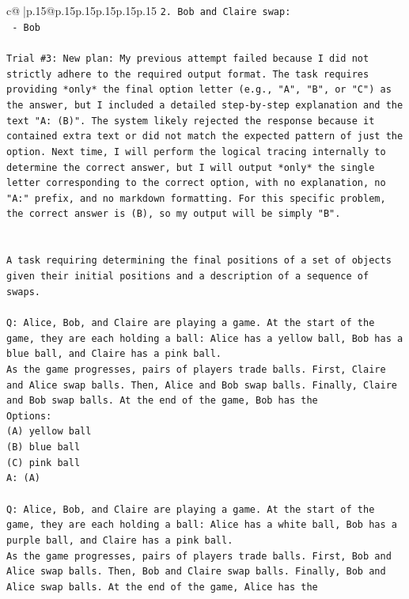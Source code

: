 \documentclass{article}
\begin{document}
{\begin{supertabular}{c@{$\;$}|p{.15\linewidth}@{}p{.15\linewidth}p{.15\linewidth}p{.15\linewidth}p{.15\linewidth}p{.15\linewidth}}
{{{\texttt{2. Bob and Claire swap:} \\
\texttt{   {-} Bob} \\
\\ 
\texttt{Trial \#3: New plan: My previous attempt failed because I did not strictly adhere to the required output format. The task requires providing *only* the final option letter (e.g., "A", "B", or "C") as the answer, but I included a detailed step{-}by{-}step explanation and the text "A: (B)". The system likely rejected the response because it contained extra text or did not match the expected pattern of just the option. Next time, I will perform the logical tracing internally to determine the correct answer, but I will output *only* the single letter corresponding to the correct option, with no explanation, no "A:" prefix, and no markdown formatting. For this specific problem, the correct answer is (B), so my output will be simply "B".} \\
\\ 
\\ 
\texttt{A task requiring determining the final positions of a set of objects given their initial positions and a description of a sequence of swaps.} \\
\\ 
\texttt{Q: Alice, Bob, and Claire are playing a game. At the start of the game, they are each holding a ball: Alice has a yellow ball, Bob has a blue ball, and Claire has a pink ball.} \\
\texttt{As the game progresses, pairs of players trade balls. First, Claire and Alice swap balls. Then, Alice and Bob swap balls. Finally, Claire and Bob swap balls. At the end of the game, Bob has the} \\
\texttt{Options:} \\
\texttt{(A) yellow ball} \\
\texttt{(B) blue ball} \\
\texttt{(C) pink ball} \\
\texttt{A: (A)} \\
\\ 
\texttt{Q: Alice, Bob, and Claire are playing a game. At the start of the game, they are each holding a ball: Alice has a white ball, Bob has a purple ball, and Claire has a pink ball.} \\
\texttt{As the game progresses, pairs of players trade balls. First, Bob and Alice swap balls. Then, Bob and Claire swap balls. Finally, Bob and Alice swap balls. At the end of the game, Alice has the} \\
}}}
\end{supertabular}}
\end{document}
